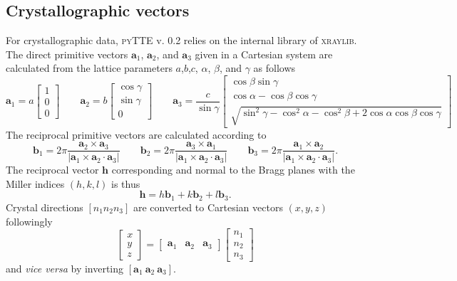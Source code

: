 \documentclass[11pt,a4paper]{article}
\begin{document}
\subsection{Crystallographic vectors}
For crystallographic data, \textsc{pyTTE} v. 0.2 relies on the internal library of \textsc{xraylib}\cite{Schoonjans_2011}. The direct primitive vectors $\mathbf{a}_1$, $\mathbf{a}_2$, and $\mathbf{a}_3$ given in a Cartesian system are calculated from the lattice parameters $a$,$b$,$c$, $\alpha$, $\beta$, and $\gamma$ as follows
\begin{equation}
\mathbf{a}_1 = a \left[\begin{matrix} 1 \\ 0 \\ 0 \end{matrix}\right] \qquad
\mathbf{a}_2 = b \left[\begin{matrix} \cos \gamma \\ \sin \gamma \\ 0 \end{matrix}\right] \qquad
\mathbf{a}_3 = \frac{c}{\sin \gamma} \left[\begin{matrix} \cos \beta \sin \gamma \\ \cos \alpha - \cos\beta \cos\gamma \\ 
\sqrt{\sin^2 \gamma - \cos^2 \alpha - \cos^2 \beta + 2 \cos \alpha \cos \beta \cos \gamma} \end{matrix}\right]
\end{equation}
The reciprocal primitive vectors are calculated according to
\begin{equation}
\mathbf{b}_1 = 2\pi \frac{\mathbf{a}_2 \times \mathbf{a}_3}{|\mathbf{a}_1 \times \mathbf{a}_2 \cdot \mathbf{a}_3|} \qquad
\mathbf{b}_2 = 2\pi \frac{\mathbf{a}_3 \times \mathbf{a}_1}{|\mathbf{a}_1 \times \mathbf{a}_2 \cdot \mathbf{a}_3|} \qquad
\mathbf{b}_3 = 2\pi \frac{\mathbf{a}_1 \times \mathbf{a}_2}{|\mathbf{a}_1 \times \mathbf{a}_2 \cdot \mathbf{a}_3|}.
\end{equation} 
The reciprocal vector $\mathbf{h}$ corresponding and normal to the Bragg planes with the Miller indices $(h,k,l)$ is thus
\begin{equation}
\mathbf{h} = h \mathbf{b}_1 + k \mathbf{b}_2 + l \mathbf{b}_3.
\end{equation}
Crystal directions $[n_1 n_2 n_3]$ are converted to Cartesian vectors $(x,y,z)$ followingly
\begin{equation}
\left[\begin{matrix} x \\ y \\ z \end{matrix}\right] = \left[\begin{matrix} \mathbf{a}_1 & \mathbf{a}_2 & \mathbf{a}_3  \end{matrix}\right] \left[\begin{matrix} n_1 \\ n_2 \\ n_3 \end{matrix}\right]
\end{equation}
and \emph{vice versa} by inverting $[\mathbf{a}_1 \ \mathbf{a}_2 \ \mathbf{a}_3]$.
\end{document}
